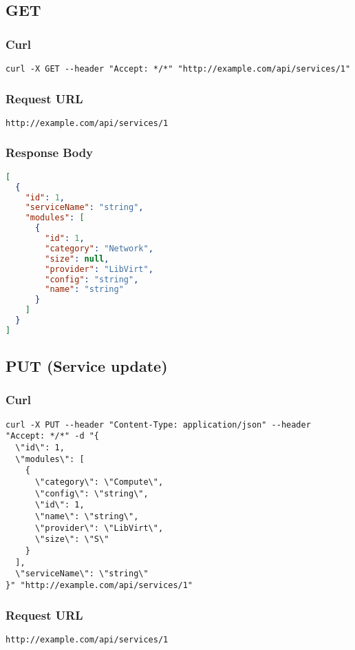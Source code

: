 \subsection{GET}
\subsubsection{Curl}
\begin{lstlisting}[style=Bash] 
curl -X GET --header "Accept: */*" "http://example.com/api/services/1"
\end{lstlisting}
\subsubsection{Request URL}
\begin{lstlisting}[] 
http://example.com/api/services/1
\end{lstlisting}

\subsubsection{Response Body}
\begin{lstlisting}[language=json] 
[
  {
    "id": 1,
    "serviceName": "string",
    "modules": [
      {
        "id": 1,
        "category": "Network",
        "size": null,
        "provider": "LibVirt",
        "config": "string",
        "name": "string"
      }
    ]
  }
]
\end{lstlisting}



\subsection{PUT (Service update)}
\subsubsection{Curl}
\begin{lstlisting}[style=Bash] 
curl -X PUT --header "Content-Type: application/json" --header "Accept: */*" -d "{
  \"id\": 1,
  \"modules\": [
    {
      \"category\": \"Compute\",
      \"config\": \"string\",
      \"id\": 1,
      \"name\": \"string\",
      \"provider\": \"LibVirt\",
      \"size\": \"S\"
    }
  ],
  \"serviceName\": \"string\"
}" "http://example.com/api/services/1"
\end{lstlisting}

\subsubsection{Request URL}
\begin{lstlisting}[] 
http://example.com/api/services/1
\end{lstlisting}


